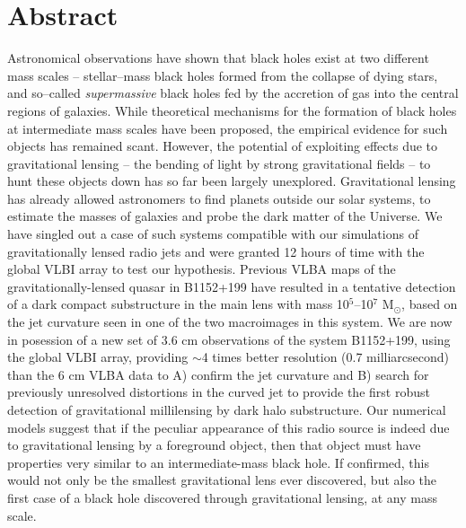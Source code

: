 \documentclass[a4paper, 11pt]{article}
\begin{document}
\section{Abstract}
Astronomical observations have shown that black holes exist at two different mass scales -- stellar--mass black holes formed from the collapse of dying stars, and so--called {\it supermassive} black holes fed by the accretion of gas into the central regions of galaxies. While theoretical mechanisms for the formation of black holes at intermediate mass scales have been proposed, the empirical evidence for such objects has remained scant. However, the potential of exploiting effects due to gravitational lensing – the bending of light by strong gravitational fields – to hunt these objects down has so far been largely unexplored.
Gravitational lensing has already allowed astronomers to find planets outside our solar systems, to estimate the masses of galaxies and probe the dark matter of the Universe. We have singled out a case of such systems compatible with our simulations of gravitationally lensed radio jets and were granted 12 hours of time with the global VLBI array to test our hypothesis. Previous VLBA maps of the gravitationally-lensed quasar in B1152+199 have resulted in a tentative detection of a dark compact substructure in the main lens with mass 10$^5$--10$^7$ M$_\odot$, based on the jet curvature seen in one of the two macroimages in this system. We are now in posession of a new set of 3.6 cm observations of the system B1152+199, using the global VLBI array, providing $\sim$4 times better resolution (0.7 milliarcsecond) than the 6 cm VLBA data to A) confirm the jet curvature and B) search for previously unresolved distortions in the curved jet to provide the first robust detection of gravitational millilensing by dark halo substructure. Our numerical models suggest that if the peculiar appearance of this radio source is indeed due to gravitational lensing by a foreground object, then that object must have properties very similar to an intermediate-mass black hole. If confirmed, this would not only be the smallest gravitational lens ever discovered, but also the first case of a black hole discovered through gravitational lensing, at any mass scale.
\end{document}
